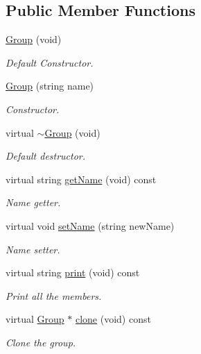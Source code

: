 \subsection*{Public Member Functions}
\begin{DoxyCompactItemize}
\item 
\hyperlink{class_group_aa6af2d4a3c356458f28074b21da1e4cd}{Group} (void)
\begin{DoxyCompactList}\small\item\em Default Constructor. \end{DoxyCompactList}\item 
\hyperlink{class_group_af214c730661c4bb60beb522c9e727539}{Group} (string name)
\begin{DoxyCompactList}\small\item\em Constructor. \end{DoxyCompactList}\item 
virtual \hyperlink{class_group_a574dd20ac1bc1b887a20674270ef0771}{$\sim$\-Group} (void)
\begin{DoxyCompactList}\small\item\em Default destructor. \end{DoxyCompactList}\item 
virtual string \hyperlink{class_group_a74b6a431e3cc5ea73fe3c827c86124b0}{get\-Name} (void) const 
\begin{DoxyCompactList}\small\item\em Name getter. \end{DoxyCompactList}\item 
virtual void \hyperlink{class_group_abefb2124b85c16a71c4f2507fcc1b929}{set\-Name} (string new\-Name)
\begin{DoxyCompactList}\small\item\em Name setter. \end{DoxyCompactList}\item 
virtual string \hyperlink{class_group_ae6aa5031cd7a0fe6e29d64953dfbb541}{print} (void) const 
\begin{DoxyCompactList}\small\item\em Print all the members. \end{DoxyCompactList}\item 
virtual \hyperlink{class_group}{Group} $\ast$ \hyperlink{class_group_a8a97ac6e71d54db8b11847b584da5e2d}{clone} (void) const 
\begin{DoxyCompactList}\small\item\em Clone the group. \end{DoxyCompactList}\item 

\end{DoxyCompactItemize}

